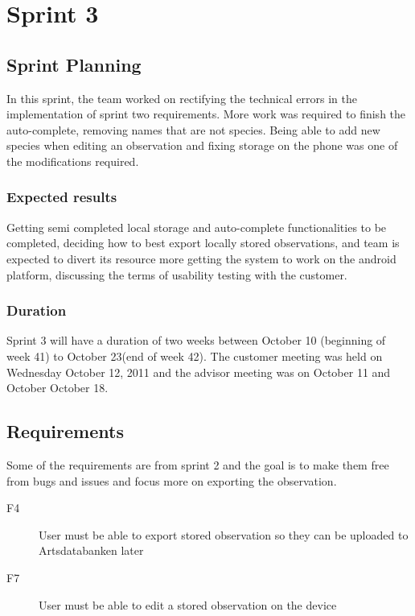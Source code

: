 \section{Sprint 3}

\subsection{Sprint Planning}

In this sprint, the team worked on rectifying the technical errors in the
implementation of sprint two requirements. More work was required to finish the
auto-complete, removing names that are not species. Being able to add new
species when editing an observation and fixing storage on the phone was one of
the modifications required.

\subsubsection{Expected results}

Getting semi completed local storage and auto-complete functionalities to be
completed, deciding how to best export locally stored observations, and team is
expected to divert its resource more getting the system to work on the android
platform, discussing the terms of usability testing with the customer.

\subsubsection{Duration}

Sprint 3 will have a duration of two weeks between October 10 (beginning of
week 41) to October 23(end of week 42). The customer meeting was held on
Wednesday October 12, 2011 and the advisor meeting was on October 11 and
October October 18.

\subsection{Requirements}

Some of the requirements are from sprint 2 and the goal is to make them free
from bugs and issues and focus more on exporting the observation.

\begin{description}
	\item[F4] User must be able to export stored observation so they can be uploaded to Artsdatabanken later
	\item[F7] User must be able to edit a stored observation on the device
\end{description}

